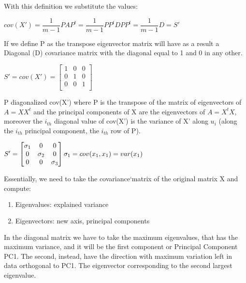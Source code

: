 With this definition we substitute the values:
\begin{center}
    $ cov(X') = \dfrac{1}{m-1} PAP^t = \dfrac{1}{m-1} PP^t D PP^t= \dfrac{1}{m-1}D =S'$
\end{center}

If we define P as the transpose eigenvector matrix will have as a result a Diagonal (D) covariance matrix with the diagonal equal to 1 and 0 in any other.

$S' = cov(X') =
\begin{bmatrix}
    1 & 0 & 0 \\
    0 & 1 & 0 \\
    0 & 0 & 1 \\
\end{bmatrix}$

P diagonalized cov(X') where P is the transpose of the matrix of eigenvectors of $ A=XX^t$ and the principal components  of X are the eigenvectors of $A=X^tX$, moreover the $i_{th} $ diagonal value of cov(X') is the variance of X' along $u_i$ (along the $i_{th}$ principal component, the $i_{th}$ row of P).

$S' = \begin{bmatrix}
    \sigma_1 & 0 & 0 \\
    0 & \sigma_2 & 0 \\
    0 & 0 & \sigma_3 \\
\end{bmatrix}
    \\
    \sigma_1 = cov(x_1,x_1) = var(x_1)
$

Essentially, we need  to take the covariance`matrix of the original matrix X and compute:
\begin{enumerate}
    \item Eigenvalues: explained variance
    \item Eigenvectors: new axis, principal components
\end{enumerate}

In the diagonal matrix we have to take the maximum eigenvalues, that has the maximum variance, and it will be the first component or Principal Component PC1. The second, instead, have the direction with maximum variation left in data orthogonal to PC1. The eigenvector corresponding to the second largest eigenvalue.

